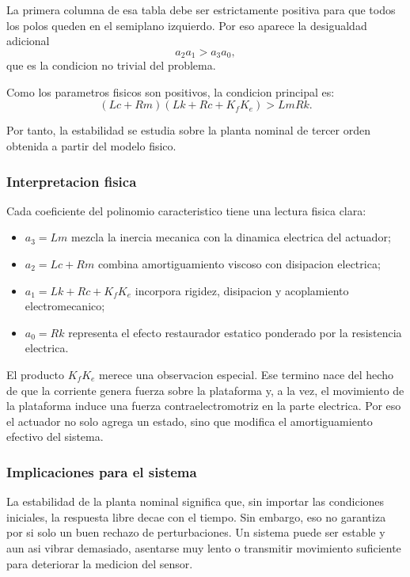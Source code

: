\documentclass[11pt]{article}
\begin{document}
La primera columna de esa tabla debe ser estrictamente positiva para que todos los polos queden en el semiplano izquierdo. Por eso aparece la desigualdad adicional
\[
a_2a_1>a_3a_0,
\]
que es la condicion no trivial del problema.

Como los parametros fisicos son positivos, la condicion principal es:
\begin{equation}
(Lc+Rm)(Lk+Rc+K_fK_e)>LmRk.
\end{equation}

Por tanto, la estabilidad se estudia sobre la planta nominal de tercer orden obtenida a partir del modelo fisico.

\subsubsection{Interpretacion fisica}

Cada coeficiente del polinomio caracteristico tiene una lectura fisica clara:

\begin{itemize}[leftmargin=1.2cm]
\item $a_3=Lm$ mezcla la inercia mecanica con la dinamica electrica del actuador;
\item $a_2=Lc+Rm$ combina amortiguamiento viscoso con disipacion electrica;
\item $a_1=Lk+Rc+K_fK_e$ incorpora rigidez, disipacion y acoplamiento electromecanico;
\item $a_0=Rk$ representa el efecto restaurador estatico ponderado por la resistencia electrica.
\end{itemize}

El producto $K_fK_e$ merece una observacion especial. Ese termino nace del hecho de que la corriente genera fuerza sobre la plataforma y, a la vez, el movimiento de la plataforma induce una fuerza contraelectromotriz en la parte electrica. Por eso el actuador no solo agrega un estado, sino que modifica el amortiguamiento efectivo del sistema.

\subsubsection{Implicaciones para el sistema}

La estabilidad de la planta nominal significa que, sin importar las condiciones iniciales, la respuesta libre decae con el tiempo. Sin embargo, eso no garantiza por si solo un buen rechazo de perturbaciones. Un sistema puede ser estable y aun asi vibrar demasiado, asentarse muy lento o transmitir movimiento suficiente para deteriorar la medicion del sensor.
\end{document}
